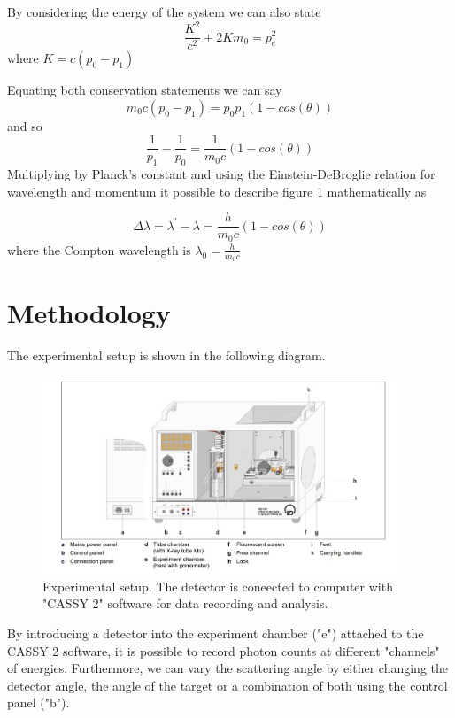 \documentclass{article}%
\begin{document}
By considering the energy of the system we can also state
\begin{equation}
    \frac{K^2}{c^2} + 2Km_0 = p_e^2 
\end{equation}
where $K = c(p_0 - p_1)$

Equating both conservation statements we can say
\begin{equation}
   m_0c(p_0 - p_1) = p_0p_1(1- cos(\theta))
\end{equation}
and so
\begin{equation}
    \frac{1}{p_1} - \frac{1}{p_0} = \frac{1}{m_0c} (1 - cos(\theta))
\end{equation}
Multiplying by Planck's constant and using the Einstein-DeBroglie relation for wavelength and momentum it possible to describe figure 1 mathematically as 

\begin{equation}
    \Delta \lambda = \lambda^\prime - \lambda = \frac{h}{m_0c} (1 - cos(\theta))
\end{equation}
where the Compton wavelength is $\lambda_0 =  \frac{h}{m_0c}$
\section{Methodology}
The experimental setup is shown in the following diagram.  
\begin{figure}[H]
    \centering%
    \includegraphics[width=400px]{setup.jpeg}
    \caption{Experimental setup. The detector is coneected to computer with "CASSY 2" software for data recording and analysis.}%
\end{figure}

By introducing a detector into the experiment chamber ("e") attached to the CASSY 2 software, it is possible to record photon counts at different "channels" of energies. Furthermore, we can vary the scattering angle by either changing the detector angle, the angle of the target or a combination of both using the control panel ("b"). 
\end{document}
